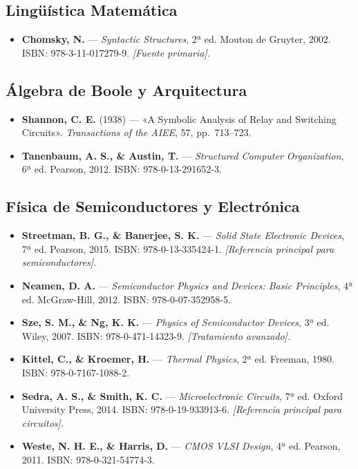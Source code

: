 \documentclass[11pt, letterpaper]{article}
\begin{document}
\subsection*{Lingüística Matemática}
\begin{itemize}
  \item \textbf{Chomsky, N.} — \emph{Syntactic Structures}, 2ª ed. Mouton de Gruyter, 2002. ISBN: 978-3-11-017279-9. \textit{[Fuente primaria].}
\end{itemize}

\subsection*{Álgebra de Boole y Arquitectura}
\begin{itemize}
  \item \textbf{Shannon, C. E.} (1938) — «A Symbolic Analysis of Relay and Switching Circuits». \textit{Transactions of the AIEE}, 57, pp.\ 713--723.
  \item \textbf{Tanenbaum, A. S., \& Austin, T.} — \emph{Structured Computer Organization}, 6ª ed. Pearson, 2012. ISBN: 978-0-13-291652-3.
\end{itemize}

\subsection*{Física de Semiconductores y Electrónica}
\begin{itemize}
  \item \textbf{Streetman, B. G., \& Banerjee, S. K.} — \emph{Solid State Electronic Devices}, 7ª ed. Pearson, 2015. ISBN: 978-0-13-335424-1. \textit{[Referencia principal para semiconductores].}
  \item \textbf{Neamen, D. A.} — \emph{Semiconductor Physics and Devices: Basic Principles}, 4ª ed. McGraw-Hill, 2012. ISBN: 978-0-07-352958-5.
  \item \textbf{Sze, S. M., \& Ng, K. K.} — \emph{Physics of Semiconductor Devices}, 3ª ed. Wiley, 2007. ISBN: 978-0-471-14323-9. \textit{[Tratamiento avanzado].}
  \item \textbf{Kittel, C., \& Kroemer, H.} — \emph{Thermal Physics}, 2ª ed. Freeman, 1980. ISBN: 978-0-7167-1088-2.
  \item \textbf{Sedra, A. S., \& Smith, K. C.} — \emph{Microelectronic Circuits}, 7ª ed. Oxford University Press, 2014. ISBN: 978-0-19-933913-6. \textit{[Referencia principal para circuitos].}
  \item \textbf{Weste, N. H. E., \& Harris, D.} — \emph{CMOS VLSI Design}, 4ª ed. Pearson, 2011. ISBN: 978-0-321-54774-3.
\end{itemize}
\end{document}
